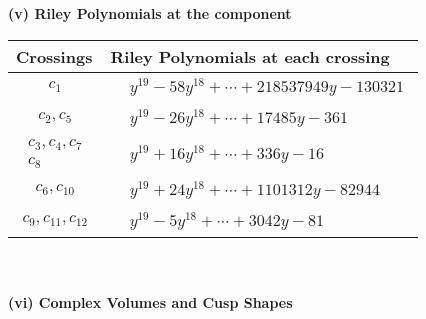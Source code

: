 \documentclass[1p]{elsarticle_modified}
\theoremstyle{definition}
\begin{document}
\newpage\renewcommand{\arraystretch}{1}
\flushleft \textbf{(v) Riley Polynomials at the component}\newline \\
\begin{tabular}{m{50pt}|m{274pt}}
Crossings & \hspace{64pt}Riley Polynomials at each crossing \\
\hline $$\begin{aligned}c_{1}\end{aligned}$$&$\begin{aligned}
&y^{19}-58 y^{18}+\cdots+218537949 y-130321
\end{aligned}$\\
\hline $$\begin{aligned}c_{2},c_{5}\end{aligned}$$&$\begin{aligned}
&y^{19}-26 y^{18}+\cdots+17485 y-361
\end{aligned}$\\
\hline $$\begin{aligned}c_{3},c_{4},c_{7}\\c_{8}\end{aligned}$$&$\begin{aligned}
&y^{19}+16 y^{18}+\cdots+336 y-16
\end{aligned}$\\
\hline $$\begin{aligned}c_{6},c_{10}\end{aligned}$$&$\begin{aligned}
&y^{19}+24 y^{18}+\cdots+1101312 y-82944
\end{aligned}$\\
\hline $$\begin{aligned}c_{9},c_{11},c_{12}\end{aligned}$$&$\begin{aligned}
&y^{19}-5 y^{18}+\cdots+3042 y-81
\end{aligned}$\\
\hline
\end{tabular}\\~\\
\newpage\flushleft \textbf{(vi) Complex Volumes and Cusp Shapes}
\end{document}

